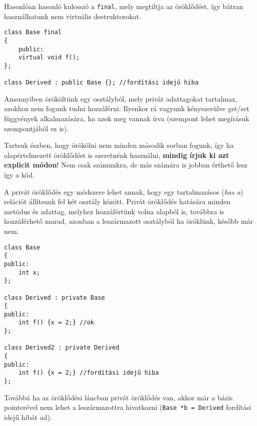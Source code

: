 \documentclass[a4paper,11.5pt,table]{article}
\begin{document}
	\smallskip
	Hasonlóan hasonló kulcsszó a \texttt{final}, mely megtiltja az öröklődést, így bátran használhatunk nem virtuális destruktorokat.
	
	\begin{lstlisting}
class Base final
{
	public:
	virtual void f();
};

class Derived : public Base {}; //fordítási idejű hiba
	\end{lstlisting}
	Amennyiben örököltünk egy osztályból, mely privát adattagokat tartalmaz, azokhoz nem fogunk tudni hozzáférni. Ilyenkor rá vagyunk kényszerülve get/set függvények alkalmazására, ha azok meg vannak írva (szempont lehet megírásuk szempontjából ez is).
	
	\medskip
	Tartsuk észben, hogy örökölni nem minden második sorban fogunk, így ha alapértelmezett öröklődést is szeretnénk használni, \textbf{mindig írjuk ki azt explicit módon}! Nem csak számunkra, de más számára is jobban érthető lesz így a kód.
	
	\medskip
	A privát öröklődés egy módszere lehet annak, hogy egy tartalmazásos (\textit{has a}) relációt állítsunk fel két osztály között. Privát öröklődés hatására minden metódus és adattag, melyhez hozzáfértünk volna alapból is, továbbra is hozzáférhető marad, azonban a leszármazott osztályból ha öröklünk, később már nem.
	\begin{lstlisting}
class Base
{
public:
	int x;
};

class Derived : private Base
{
public:
	int f() {x = 2;} //ok
};

class Derived2 : private Derived
{
public:
	int f() {x = 2;} //fordítási idejű hiba
};
	\end{lstlisting}
	Továbbá ha az öröklődési láncban privát öröklődés van, akkor már a bázis pointerével nem lehet a leszármazottra hivatkozni (\texttt{Base *b = Derived} fordítási idejű hibát ad).
	\medskip
	
\end{document}
